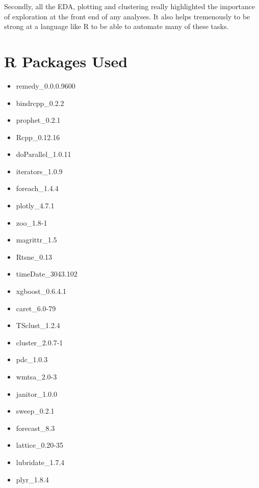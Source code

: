 \documentclass[floatsintext,man]{apa6}
\providecommand{\tightlist}{%
  \setlength{\itemsep}{0pt}\setlength{\parskip}{0pt}}
\theoremstyle{definition}
\theoremstyle{definition}
\theoremstyle{definition}
\theoremstyle{remark}
\begin{document}
Secondly, all the EDA, plotting and clustering really highlighted the
importance of exploration at the front end of any analyses. It also
helps tremenously to be strong at a language like R to be able to
automate many of these tasks.

\newpage

\section{R Packages Used}\label{r-packages-used}

\begin{itemize}
\tightlist
\item
  remedy\_0.0.0.9600\\
\item
  bindrcpp\_0.2.2\\
\item
  prophet\_0.2.1
\item
  Rcpp\_0.12.16\\
\item
  doParallel\_1.0.11\\
\item
  iterators\_1.0.9
\item
  foreach\_1.4.4
\item
  plotly\_4.7.1\\
\item
  zoo\_1.8-1\\
\item
  magrittr\_1.5
\item
  Rtsne\_0.13
\item
  timeDate\_3043.102\\
\item
  xgboost\_0.6.4.1
\item
  caret\_6.0-79
\item
  TSclust\_1.2.4
\item
  cluster\_2.0.7-1\\
\item
  pdc\_1.0.3\\
\item
  wmtsa\_2.0-3
\item
  janitor\_1.0.0\\
\item
  sweep\_0.2.1
\item
  forecast\_8.3
\item
  lattice\_0.20-35
\item
  lubridate\_1.7.4
\item
  plyr\_1.8.4\\

\end{itemize}
\end{document}
